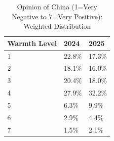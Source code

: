 \begin{table}[!h]
\centering
\caption{Opinion of China (1=Very Negative to 7=Very Positive): Weighted Distribution}
\centering
\begin{tabular}[t]{lll}
\toprule
Warmth Level & 2024 & 2025\\
\midrule
1 & 22.8\% & 17.3\%\\
2 & 18.1\% & 16.0\%\\
3 & 20.4\% & 18.0\%\\
4 & 27.9\% & 32.2\%\\
5 & 6.3\% & 9.9\%\\
6 & 2.9\% & 4.4\%\\
7 & 1.5\% & 2.1\%\\
\bottomrule
\end{tabular}
\end{table}
